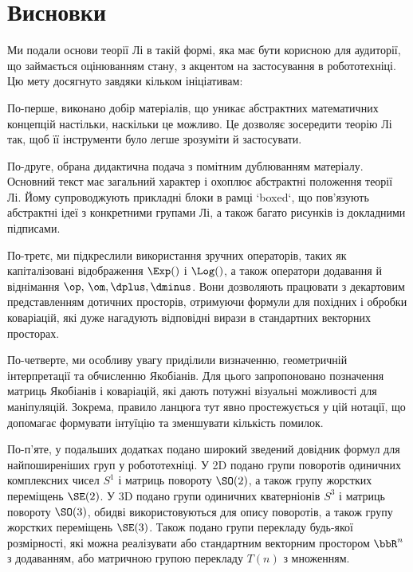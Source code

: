 
\section{Висновки}

Ми подали основи теорії Лі в такій формі, яка має бути корисною для аудиторії, що займається оцінюванням стану, з акцентом на застосування в робототехніці.
Цю мету досягнуто завдяки кільком ініціативам:

По-перше, виконано добір матеріалів, що уникає абстрактних математичних концепцій настільки, наскільки це можливо.
Це дозволяє зосередити теорію Лі так, щоб її інструменти було легше зрозуміти й застосувати.

По-друге, обрана дидактична подача з помітним дублюванням матеріалу.
Основний текст має загальний характер і охоплює абстрактні положення теорії Лі.
Йому супроводжують прикладні блоки в рамці `boxed`, що пов'язують абстрактні ідеї з конкретними групами Лі, а також багато рисунків із докладними підписами.

По-третє, ми підкреслили використання зручних операторів, таких як капіталізовані відображення $
\Exp()$ і $
\Log()$, а також оператори додавання й віднімання $
\op,\,\om, \dplus, \dminus$.
Вони дозволяють працювати з декартовим представленням дотичних просторів, отримуючи формули для похідних і обробки коваріацій, які дуже нагадують відповідні вирази в стандартних векторних просторах.

По-четверте, ми особливу увагу приділили визначенню, геометричній інтерпретації та обчисленню Якобіанів.
Для цього запропоновано позначення матриць Якобіанів і коваріацій, які дають потужні візуальні можливості для маніпуляцій.
Зокрема, правило ланцюга тут явно простежується у цій нотації, що допомагає формувати інтуїцію та зменшувати кількість помилок.

По-п'яте, у подальших додатках подано широкий зведений довідник формул для найпоширеніших груп у робототехніці.
У 2D подано групи поворотів одиничних комплексних чисел $S^1$ і матриць повороту $
\SO(2)$, а також групу жорстких переміщень $
\SE(2)$.
У 3D подано групи одиничних кватерніонів $S^3$ і матриць повороту $
\SO(3)$, обидві використовуються для опису поворотів, а також групу жорстких переміщень $
\SE(3)$.
Також подано групи перекладу будь-якої розмірності, які можна реалізувати або стандартним векторним простором $
\bbR^n$ з додаванням, або матричною групою перекладу $T(n)$ з множенням.

